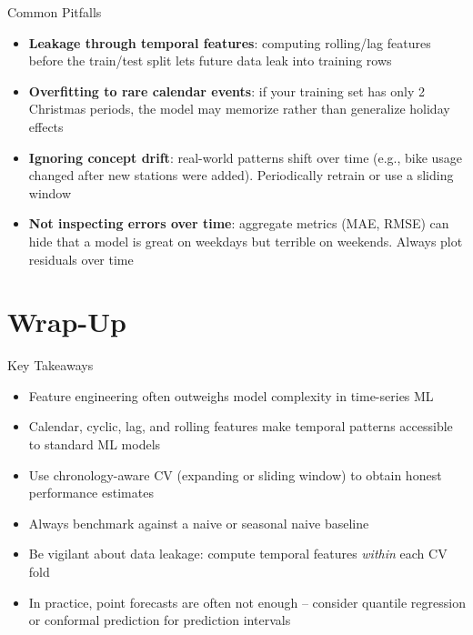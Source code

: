 \documentclass[11pt,compress,t,notes=noshow, xcolor=table]{beamer}
\begin{document}
\begin{vbframe}{Common Pitfalls}
\vfill
\begin{itemize}
    \item \textbf{Leakage through temporal features}: computing rolling/lag features before the train/test split lets future data leak into training rows
    \item \textbf{Overfitting to rare calendar events}: if your training set has only 2 Christmas periods, the model may memorize rather than generalize holiday effects
    \item \textbf{Ignoring concept drift}: real-world patterns shift over time (e.g., bike usage changed after new stations were added). Periodically retrain or use a sliding window
    \item \textbf{Not inspecting errors over time}: aggregate metrics (MAE, RMSE) can hide that a model is great on weekdays but terrible on weekends. Always plot residuals over time
\end{itemize}
\vfill
\end{vbframe}


\section{Wrap-Up}
\begin{vbframe}{Key Takeaways}
  \vfill
  \begin{itemize}
    \item Feature engineering often outweighs model complexity in time-series ML
    \item Calendar, cyclic, lag, and rolling features make temporal patterns accessible to standard ML models
    \item Use chronology-aware CV (expanding or sliding window) to obtain honest performance estimates
    \item Always benchmark against a naive or seasonal naive baseline
    \item Be vigilant about data leakage: compute temporal features \emph{within} each CV fold
    \item In practice, point forecasts are often not enough -- consider quantile regression or conformal prediction for prediction intervals
  \end{itemize}
  \vfill
\end{vbframe}

\end{document}
